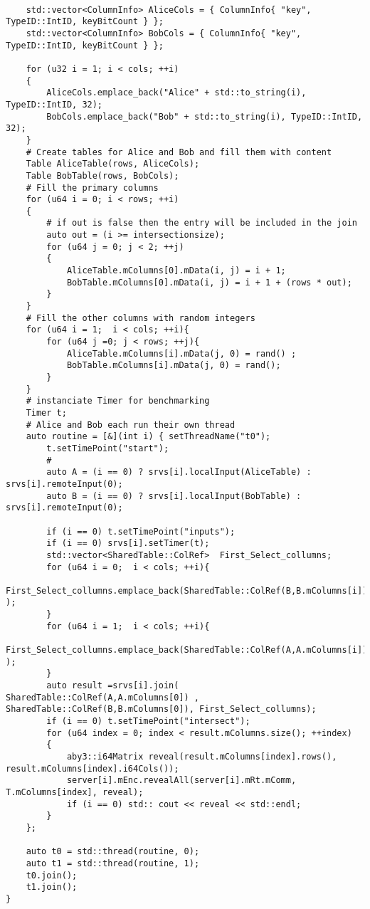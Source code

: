 \begin{lstlisting}[caption={Simpifiyed Protocol for our first use-case in ABY3}]
	
	std::vector<ColumnInfo> AliceCols = { ColumnInfo{ "key", TypeID::IntID, keyBitCount } };
	std::vector<ColumnInfo> BobCols = { ColumnInfo{ "key", TypeID::IntID, keyBitCount } };
	
	for (u32 i = 1; i < cols; ++i)
	{
		AliceCols.emplace_back("Alice" + std::to_string(i), TypeID::IntID, 32);
		BobCols.emplace_back("Bob" + std::to_string(i), TypeID::IntID, 32);
	}
	# Create tables for Alice and Bob and fill them with content
	Table AliceTable(rows, AliceCols);
	Table BobTable(rows, BobCols);
	# Fill the primary columns 
	for (u64 i = 0; i < rows; ++i)
	{
		# if out is false then the entry will be included in the join
		auto out = (i >= intersectionsize);
		for (u64 j = 0; j < 2; ++j)
		{
			AliceTable.mColumns[0].mData(i, j) = i + 1;
			BobTable.mColumns[0].mData(i, j) = i + 1 + (rows * out);
		}
	}
	# Fill the other columns with random integers
	for (u64 i = 1;  i < cols; ++i){
		for (u64 j =0; j < rows; ++j){
			AliceTable.mColumns[i].mData(j, 0) = rand() ;
			BobTable.mColumns[i].mData(j, 0) = rand();	
		}
	}
	# instanciate Timer for benchmarking
	Timer t;
	# Alice and Bob each run their own thread 
	auto routine = [&](int i) { setThreadName("t0");
		t.setTimePoint("start");
		# 
		auto A = (i == 0) ? srvs[i].localInput(AliceTable) : srvs[i].remoteInput(0);
		auto B = (i == 0) ? srvs[i].localInput(BobTable) : srvs[i].remoteInput(0);
		
		if (i == 0) t.setTimePoint("inputs");
		if (i == 0) srvs[i].setTimer(t);
		std::vector<SharedTable::ColRef>  First_Select_collumns;		
		for (u64 i = 0;  i < cols; ++i){
			First_Select_collumns.emplace_back(SharedTable::ColRef(B,B.mColumns[i]) );
		}
		for (u64 i = 1;  i < cols; ++i){
			First_Select_collumns.emplace_back(SharedTable::ColRef(A,A.mColumns[i]) );
		}
		auto result =srvs[i].join( SharedTable::ColRef(A,A.mColumns[0]) , SharedTable::ColRef(B,B.mColumns[0]), First_Select_collumns);
		if (i == 0) t.setTimePoint("intersect");
		for (u64 index = 0; index < result.mColumns.size(); ++index)
		{
			aby3::i64Matrix reveal(result.mColumns[index].rows(),  result.mColumns[index].i64Cols());
			server[i].mEnc.revealAll(server[i].mRt.mComm, T.mColumns[index], reveal);
			if (i == 0) std:: cout << reveal << std::endl;	
		}
	};
	
	auto t0 = std::thread(routine, 0);
	auto t1 = std::thread(routine, 1);
	t0.join();
	t1.join();
}
\end{lstlisting}
